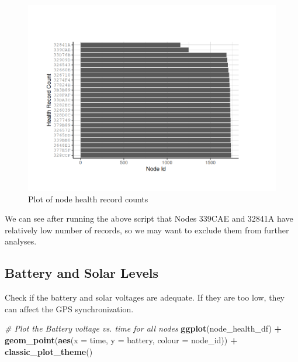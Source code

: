 \documentclass[
]{book}
\newenvironment{Shaded}{\begin{snugshade}}{\end{snugshade}}
\newcommand{\AttributeTok}[1]{\textcolor[rgb]{0.13,0.29,0.53}{#1}}
\newcommand{\CommentTok}[1]{\textcolor[rgb]{0.56,0.35,0.01}{\textit{#1}}}
\newcommand{\FunctionTok}[1]{\textcolor[rgb]{0.13,0.29,0.53}{\textbf{#1}}}
\newcommand{\NormalTok}[1]{#1}
\newcommand{\SpecialCharTok}[1]{\textcolor[rgb]{0.81,0.36,0.00}{\textbf{#1}}}
\begin{document}
\begin{figure}
\centering
\includegraphics{images/node_check_1.1.2_check_if_nodes_are_operating_properly.png}
\caption{Plot of node health record counts}
\end{figure}

We can see after running the above script that Nodes 339CAE and 32841A have relatively low number of records, so we may want to exclude them from further analyses.

\subsection{Battery and Solar Levels}\label{battery-and-solar-levels}

Check if the battery and solar voltages are adequate. If they are too low, they can affect the GPS synchronization.

\begin{Shaded}
\begin{Highlighting}[]
\CommentTok{\# Plot the Battery voltage vs. time for all nodes}
\FunctionTok{ggplot}\NormalTok{(node\_health\_df) }\SpecialCharTok{+}
  \FunctionTok{geom\_point}\NormalTok{(}\FunctionTok{aes}\NormalTok{(}\AttributeTok{x =}\NormalTok{ time,}
                 \AttributeTok{y =}\NormalTok{ battery,}
                 \AttributeTok{colour =}\NormalTok{ node\_id)) }\SpecialCharTok{+}
  \FunctionTok{classic\_plot\_theme}\NormalTok{()}
\end{Highlighting}
\end{Shaded}
\end{document}
